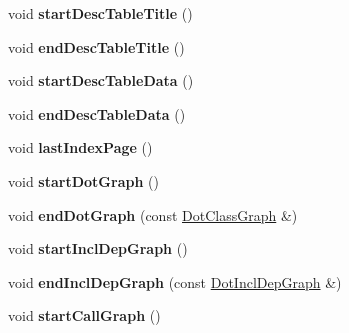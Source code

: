 \begin{DoxyCompactItemize}
\item 
\hypertarget{class_latex_generator_a5ab1218802d388186a056cba7ea439e2}{void {\bfseries start\-Desc\-Table\-Title} ()}\label{class_latex_generator_a5ab1218802d388186a056cba7ea439e2}

\item 
\hypertarget{class_latex_generator_a25c810f32509fa5a79d86d96a3d4a275}{void {\bfseries end\-Desc\-Table\-Title} ()}\label{class_latex_generator_a25c810f32509fa5a79d86d96a3d4a275}

\item 
\hypertarget{class_latex_generator_ade74ab43d9c69e30b4344e7d176bd07e}{void {\bfseries start\-Desc\-Table\-Data} ()}\label{class_latex_generator_ade74ab43d9c69e30b4344e7d176bd07e}

\item 
\hypertarget{class_latex_generator_aba60999e7c19eb5c546be43e157de98d}{void {\bfseries end\-Desc\-Table\-Data} ()}\label{class_latex_generator_aba60999e7c19eb5c546be43e157de98d}

\item 
\hypertarget{class_latex_generator_a9fcbfbb9afd01da287ac464c1da0d778}{void {\bfseries last\-Index\-Page} ()}\label{class_latex_generator_a9fcbfbb9afd01da287ac464c1da0d778}

\item 
\hypertarget{class_latex_generator_a3ea98cf1d0374587532fd534eb207de3}{void {\bfseries start\-Dot\-Graph} ()}\label{class_latex_generator_a3ea98cf1d0374587532fd534eb207de3}

\item 
\hypertarget{class_latex_generator_abb7b25f84e637dfb1f2e6aa48ed261ad}{void {\bfseries end\-Dot\-Graph} (const \hyperlink{class_dot_class_graph}{Dot\-Class\-Graph} \&)}\label{class_latex_generator_abb7b25f84e637dfb1f2e6aa48ed261ad}

\item 
\hypertarget{class_latex_generator_a94461be722782868a8ecb74a7fe44a35}{void {\bfseries start\-Incl\-Dep\-Graph} ()}\label{class_latex_generator_a94461be722782868a8ecb74a7fe44a35}

\item 
\hypertarget{class_latex_generator_ac5b96f27fcdca2efe79600038e10cfc4}{void {\bfseries end\-Incl\-Dep\-Graph} (const \hyperlink{class_dot_incl_dep_graph}{Dot\-Incl\-Dep\-Graph} \&)}\label{class_latex_generator_ac5b96f27fcdca2efe79600038e10cfc4}

\item 
\hypertarget{class_latex_generator_a8b9ae07c2a7ca51c0100e5258c16b663}{void {\bfseries start\-Call\-Graph} ()}\label{class_latex_generator_a8b9ae07c2a7ca51c0100e5258c16b663}


\end{DoxyCompactItemize}
